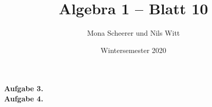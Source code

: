 \documentclass{scrartcl}
\title{Algebra 1 -- Blatt 10}
\date{Wintersemester 2020}
\author{Mona Scheerer und Nils Witt}
\begin{document}
\maketitle
    \textbf{Aufgabe 3.} \\
    \textbf{Aufgabe 4.}
    
\end{document}
